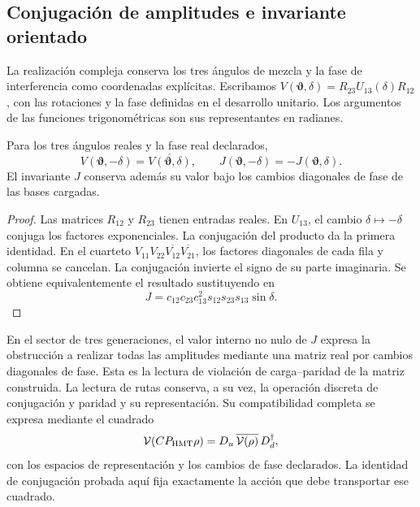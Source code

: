 \subsection{Conjugación de amplitudes e invariante orientado}
\label{sec:ii09-conjugacion-amplitudes}

La realización compleja conserva los tres ángulos de mezcla y
la fase de interferencia como coordenadas explícitas. Escribamos
\(V(\boldsymbol\vartheta,\delta)
=R_{23}U_{13}(\delta)R_{12}\), con las rotaciones y la fase
definidas en el desarrollo unitario. Los argumentos de las
funciones trigonométricas son sus representantes en radianes.

\begin{proposition}
\label{prop:ii09-conjugacion-unitaria}
Para los tres ángulos reales y la fase real declarados,
\[
 V(\boldsymbol\vartheta,-\delta)
       =\overline{V(\boldsymbol\vartheta,\delta)},
 \qquad
 J(\boldsymbol\vartheta,-\delta)
       =-J(\boldsymbol\vartheta,\delta).
\]
El invariante \(J\) conserva además su valor bajo los cambios
diagonales de fase de las bases cargadas.
\end{proposition}
\begin{proof}
Las matrices \(R_{12}\) y \(R_{23}\) tienen entradas reales.
En \(U_{13}\), el cambio \(\delta\mapsto-\delta\) conjuga
los factores exponenciales. La conjugación del producto da la
primera identidad. En el cuarteto
\(V_{11}V_{22}\overline{V_{12}}\overline{V_{21}}\), los
factores diagonales de cada fila y columna se cancelan. La
conjugación invierte el signo de su parte imaginaria. Se obtiene
equivalentemente el resultado sustituyendo en
\[
 J=c_{12}c_{23}c_{13}^{2}s_{12}s_{23}s_{13}\sin\delta.
\]
\end{proof}

En el sector de tres generaciones, el valor interno no nulo de
\(J\) expresa la obstrucción a realizar todas las amplitudes
mediante una matriz real por cambios diagonales de fase. Esta
es la lectura de violación de carga--paridad de la matriz
construida. La lectura de rutas conserva, a su vez, la operación
discreta de conjugación y paridad y su representación. Su
compatibilidad completa se expresa mediante el cuadrado
\[
 \mathcal V(CP_{\rm HMT}\rho)
  =D_u\,\overline{\mathcal V(\rho)}\,D_d^{\dagger},
\]
con los espacios de representación y los cambios de fase
declarados. La identidad de conjugación probada aquí fija
exactamente la acción que debe transportar ese cuadrado.
